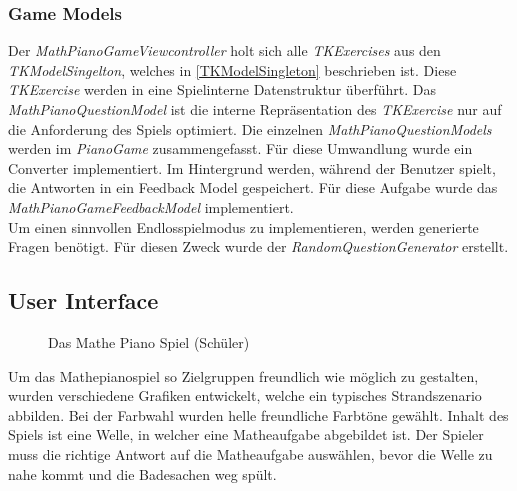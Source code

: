 \subsubsection{Game Models}
Der \textit{MathPianoGameViewcontroller} holt sich alle \textit{TKExercises} aus den \textit{TKModelSingelton}, welches in \ref{TKModelSingleton}  beschrieben ist. Diese \textit{TKExercise} werden in eine Spielinterne Datenstruktur überführt. Das \textit{MathPianoQuestionModel} ist die interne Repräsentation des \textit{TKExercise} nur auf die Anforderung des Spiels optimiert. Die einzelnen \textit{MathPianoQuestionModels} werden im \textit{PianoGame} zusammengefasst. Für diese Umwandlung wurde ein Converter implementiert. 
Im Hintergrund werden, während der Benutzer spielt, die Antworten in ein Feedback Model gespeichert. Für diese Aufgabe wurde das \textit{MathPianoGameFeedbackModel} implementiert.\\
Um einen sinnvollen Endlosspielmodus zu implementieren, werden generierte Fragen benötigt. Für diesen Zweck wurde der \textit{RandomQuestionGenerator} erstellt.

\subsection{User Interface}
\begin{figure}[H]
	\centering
	\caption{Das Mathe Piano Spiel (Schüler)}
	\label{Das Mathe Piano Spiel}
\end{figure}
Um das Mathepianospiel so Zielgruppen freundlich wie möglich zu gestalten, wurden verschiedene Grafiken entwickelt, welche ein typisches Strandszenario abbilden. Bei der Farbwahl wurden helle freundliche Farbtöne gewählt. Inhalt des Spiels ist eine Welle, in welcher eine Matheaufgabe abgebildet ist. Der Spieler muss die richtige Antwort auf die Matheaufgabe auswählen, bevor die Welle zu nahe kommt und die Badesachen weg spült.



